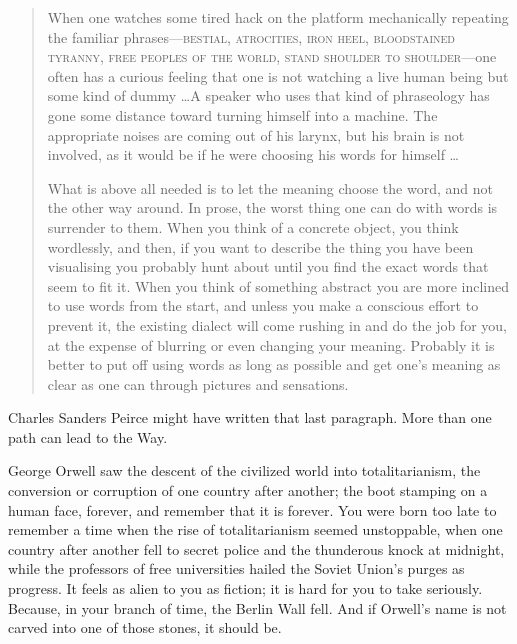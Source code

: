 \begin{quotation}
{
 When one watches some tired hack on the platform mechanically
repeating the familiar phrases---\textsc{bestial, atrocities, iron heel,
bloodstained tyranny, free peoples of the world, stand shoulder to
shoulder}---one often has a curious feeling that one is not watching a
live human being but some kind of dummy \ldots A speaker who uses that
kind of phraseology has gone some distance toward turning himself into
a machine. The appropriate noises are coming out of his larynx, but his
brain is not involved, as it would be if he were choosing his words for
himself \ldots}

{
 What is above all needed is to let the meaning choose the word,
and not the other way around. In prose, the worst thing one can do with
words is surrender to them. When you think of a concrete object, you
think wordlessly, and then, if you want to describe the thing you have
been visualising you probably hunt about until you find the exact words
that seem to fit it. When you think of something abstract you are more
inclined to use words from the start, and unless you make a conscious
effort to prevent it, the existing dialect will come rushing in and do
the job for you, at the expense of blurring or even changing your
meaning. Probably it is better to put off using words as long as
possible and get one's meaning as clear as one can
through pictures and sensations.}
\end{quotation}

{
 Charles Sanders Peirce might have written that last paragraph.
More than one path can lead to the Way.}

\myendsectiontext


\bigskip


{
 George Orwell saw the descent of the civilized world into
totalitarianism, the conversion or corruption of one country after
another; the boot stamping on a human face, forever, and remember that
it is forever. You were born too late to remember a time when the rise
of totalitarianism seemed unstoppable, when one country after another
fell to secret police and the thunderous knock at midnight, while the
professors of free universities hailed the Soviet
Union's purges as progress. It feels as alien to you as
fiction; it is hard for you to take seriously. Because, in your branch
of time, the Berlin Wall fell. And if Orwell's name is
not carved into one of those stones, it should be. }

